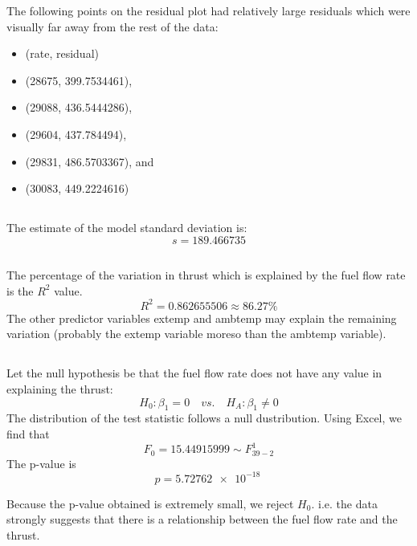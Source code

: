 \documentclass[letterpaper]{article}
\begin{document}
The following points on the residual plot had relatively large residuals which were
visually far away from the rest of the data:
\begin{itemize}
 \item[] (rate, residual)
 \item[] (28675, 399.7534461),
 \item[] (29088, 436.5444286),
 \item[] (29604, 437.784494),
 \item[] (29831, 486.5703367), and
 \item[] (30083, 449.2224616)
\end{itemize}

\subsection{}
The estimate of the model standard deviation is:
$$s = 189.466735$$

\subsection{}

The percentage of the variation in thrust which is explained by the fuel flow rate
is the $R^2$ value.
$$R^2 = 0.862655506 \approx 86.27\%$$
The other predictor variables extemp and ambtemp may explain the remaining variation
(probably the extemp variable moreso than the ambtemp variable).

\subsection{}

Let the null hypothesis be that the fuel flow rate does not have any value in explaining the thrust:
$$ H_0: \beta_1 =0 \quad vs. \quad H_A: \beta_1 \neq 0 $$
The distribution of the test statistic follows a null dustribution.
Using Excel, we find that
$$F_0 = 15.44915999 \sim F_{39-2}^{1}$$
The p-value is
$$p= \SI{5.72762e-18}{} $$

Because the p-value obtained is extremely small, we reject $H_0$. i.e. the data strongly suggests that there is a relationship between the fuel flow rate and the thrust.
\end{document}
